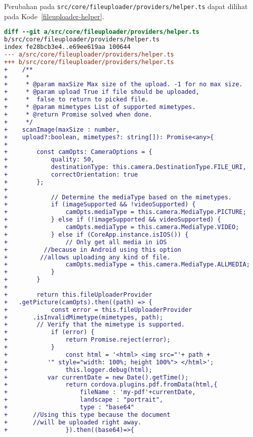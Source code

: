 Perubahan pada \texttt{src/core/fileuploader/providers/helper.ts} dapat dilihat pada \mbox{Kode \ref{fileuploader-helper}}. 

\begin{lstlisting}[language=diff, frame=single, label ={fileuploader-helper}, caption = Perubahan pada \texttt{src/core/fileuploader/providers/helper.ts} ]
diff --git a/src/core/fileuploader/providers/helper.ts 
b/src/core/fileuploader/providers/helper.ts
index fe28bcb3e4..e69ee619aa 100644
--- a/src/core/fileuploader/providers/helper.ts
+++ b/src/core/fileuploader/providers/helper.ts
+    /**
+     * 
+     * @param maxSize Max size of the upload. -1 for no max size.
+     * @param upload True if file should be uploaded,
+     *  false to return to picked file.
+     * @param mimetypes List of supported mimetypes.  
+     * @return Promise solved when done.
+     */
+    scanImage(maxSize : number,
+    upload?:boolean, mimetypes?: string[]): Promise<any>{
+
+        const camOpts: CameraOptions = {
+            quality: 50,
+            destinationType: this.camera.DestinationType.FILE_URI,
+            correctOrientation: true
+        };
+
+            // Determine the mediaType based on the mimetypes.
+            if (imageSupported && !videoSupported) {
+                camOpts.mediaType = this.camera.MediaType.PICTURE;
+            } else if (!imageSupported && videoSupported) {
+                camOpts.mediaType = this.camera.MediaType.VIDEO;
+            } else if (CoreApp.instance.isIOS()) {
+                // Only get all media in iOS 
+	       //because in Android using this option 
+	      //allows uploading any kind of file.
+                camOpts.mediaType = this.camera.MediaType.ALLMEDIA;
+            }
+        }
+
+        return this.fileUploaderProvider
+	.getPicture(camOpts).then((path) => {
+            const error = this.fileUploaderProvider
+	    .isInvalidMimetype(mimetypes, path); 
+	     // Verify that the mimetype is supported.
+            if (error) {
+                return Promise.reject(error);
+            }
+                const html = '<html> <img src="'+ path +
+	        '" style="width: 100%; height 100%"> </html>';
+                this.logger.debug(html);
+ 	        var currentDate = new Date().getTime();
+                return cordova.plugins.pdf.fromData(html,{
+                    fileName : 'my-pdf'+currentDate,
+                    landscape : "portrait",
+                    type : "base64" 
+		//Using this type because the document 
+		//will be uploaded right away.
+                }).then((base64)=>{   

\end{lstlisting}
